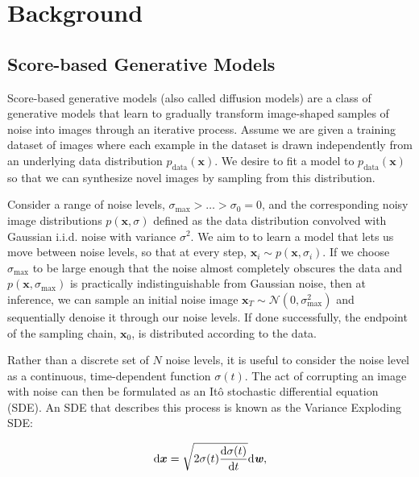 \section{Background}

\subsection{Score-based Generative Models}

\newcommand{\ex}{\boldsymbol{x}}
\newcommand{\qvec}[1]{\textbf{\textit{#1}}}

Score-based generative models (also called diffusion models) are a class of generative models that learn to gradually transform image-shaped samples of noise into images through an iterative process. Assume we are given a training dataset of images where each example in the dataset is drawn independently from an underlying data distribution $p_{\text{data}}(\boldsymbol{x})$. We desire to fit a model to $p_{\text{data}}(\boldsymbol{x})$ so that we can synthesize novel images by sampling from this distribution.

Consider a range of noise levels, $\sigma_{\text{max}} > \ldots > \sigma_{0} = 0$, and the corresponding noisy image distributions $p(\ex, \sigma)$ defined as the data distribution convolved with Gaussian i.i.d. noise with variance $\sigma^2$. We aim to to learn a model that lets us move between noise levels, so that at every step, $\ex_i \sim p(\ex, \sigma_i)$. If we choose $\sigma_{\text{max}}$ to be large enough that the noise almost completely obscures the data and $p(\ex, \sigma_{\text{max}})$ is practically indistinguishable from Gaussian noise, then at inference, we can sample an initial noise image $\ex_T \sim \mathcal{N}(0, \sigma_{\text{max}}^2)$
 and sequentially denoise it through our noise levels. If done successfully, the endpoint of the sampling chain, $\ex_0$, is distributed according to the data.

Rather than a discrete set of $N$ noise levels, it is useful to consider the noise level as a continuous, time-dependent function $\sigma(t)$. The act of corrupting an image with noise can then be formulated as an It{\^o} stochastic differential equation (SDE). An SDE that describes this process is known as the Variance Exploding SDE:

\begin{equation}
    \text{d}\ex = \sqrt{2 \sigma(t) \frac{\text{d} \sigma(t)}{\text{d} t}}\text{d}\qvec{w}, \label{eq:ve_forward}
\end{equation}

